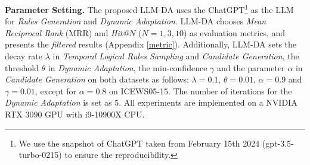 \documentclass{article}
\begin{document}
\textbf{Parameter Setting.} 
The proposed LLM-DA uses the ChatGPT\footnote{We use the snapshot of ChatGPT taken from February 15th 2024 (gpt-3.5-turbo-0215) to ensure the reproducibility.} as the LLM for \textit{Rules Generation} and \textit{Dynamic Adaptation}. 
LLM-DA chooses \textit{Mean Reciprocal Rank} (MRR) and \textit{Hit@}$N$ ($N=1,3,10$) as evaluation metrics, and presents the \textit{filtered} results (Appendix \ref{metric}). 
Additionally, LLM-DA sets the decay rate $\lambda$ in \textit{Temporal Logical Rules Sampling} and \textit{Candidate Generation}, the threshold $\theta$ in \textit{Dynamic Adaptation}, the min-confidence $\gamma$ and the parameter $\alpha$ in \textit{Candidate Generation} on both datasets as follows: $\lambda = 0.1$, $\theta = 0.01$, $\alpha = 0.9$ and $\gamma = 0.01$, except for $\alpha = 0.8$ on ICEWS05-15. The number of iterations for the \textit{Dynamic Adaptation} is set as $5$. All experiments are  implemented on a NVIDIA RTX 3090 GPU with i9-10900X CPU. 
\end{document}
